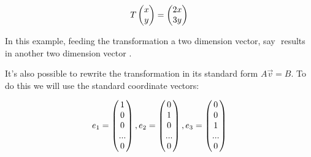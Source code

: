 \documentclass{article}
\begin{document}
		 \[
		T
		\left(\begin{array}{@{}c@{}}
			x \\
			y \\
		\end{array}\right) = 
			\left(\begin{array}{@{}c@{}}
		2x \\
		3y \\
	\end{array}\right) 
		\]
		
	\par\noindent In this example, feeding the transformation a two dimension vector, say \(<1,3>\) results in another two dimension vector \(<2,9>\).
	\newline
	\par\noindent It's also possible to rewrite the transformation in its standard form \(A \vec v = B\). To do this we will use the standard coordinate vectors:
	
			 \[
	e_1 =
	\left(\begin{array}{@{}c@{}}
		1 \\
		0 \\
		0 \\
		...\\
		0
	\end{array}\right),
 	e_2 =
 \left(\begin{array}{@{}c@{}}
 	0 \\
 	1 \\
 	0 \\
 	...\\
 	0
 	\end{array}\right), 
 	e_3 =
 \left(\begin{array}{@{}c@{}}
 	0 \\
 	0 \\
 	1 \\
 	...\\
 	0
 \end{array}\right)
	\]
	
\end{document}
